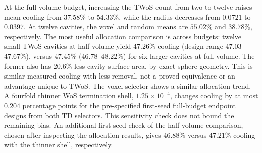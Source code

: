 At the full volume budget, increasing the TWoS count from two to twelve raises mean cooling from $37.58\%$ to $54.33\%$, while the radius decreases from $0.0721$ to $0.0397$. At twelve cavities, the voxel and random means are $55.02\%$ and $38.78\%$, respectively. The most useful allocation comparison is across budgets: twelve small TWoS cavities at half volume yield $47.26\%$ cooling (design range $47.03$--$47.67\%$), versus $47.45\%$ ($46.78$--$48.22\%$) for six larger cavities at full volume. The former also has $20.6\%$ less cavity surface area, by exact sphere geometry. This is similar measured cooling with less removal, not a proved equivalence or an advantage unique to TWoS. The voxel selector shows a similar allocation trend. A fourfold thinner WoS termination shell, $1.25\times10^{-4}$, changes cooling by at most $0.204$ percentage points for the pre-specified first-seed full-budget endpoint designs from both TD selectors. This sensitivity check does not bound the remaining bias.
An additional first-seed check of the half-volume comparison, chosen after inspecting the allocation results, gives $46.88\%$ versus $47.21\%$ cooling with the thinner shell, respectively.
